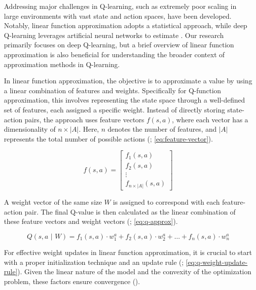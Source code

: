 \noindent Addressing major challenges in Q-learning, such as extremely poor scaling in large environments with vast state and action spaces,  have been developed. Notably, linear function approximation adopts a statistical approach, while deep Q-learning leverages artificial neural networks to estimate . Our research primarily focuses on deep Q-learning, but a brief overview of linear function approximation is also beneficial for understanding the broader context of approximation methods in Q-learning. 

\bigskip


\noindent In linear function approximation, the objective is to approximate a value by using a linear combination of features and weights. Specifically for Q-function approximation, this involves representing the state space through a well-defined set of features, each assigned a specific weight. Instead of directly storing state-action pairs, the approach uses feature vectors $f(s,a)$, where each vector has a dimensionality of $n \times |A|$. Here, $n$ denotes the number of features, and $|A|$ represents the total number of possible actions (\textcolor{deepblue}{\cite{valuemethods}; \autoref{eq:feature-vector}}).

\begin{equation}
        f(s,a) = \begin{bmatrix}
        f_1(s,a) \\
        f_2(s,a) \\
        \vdots \\
        f_{n \times |A|}(s,a)
        \end{bmatrix}
    \label{eq:feature-vector}
\end{equation}

\noindent A weight vector of the same size $W$ is assigned to correspond with each feature-action pair. The final Q-value is then calculated as the linear combination of these feature vectors and weight vectors (\textcolor{deepblue}{\cite{valuemethods}; \autoref{eq:q-approx}}).

\begin{equation}
    Q(s, a \text{ | } W) = f_1(s, a) \cdot w_1^a + f_2(s, a) \cdot w_2^a + \hdots + f_n(s, a) \cdot w_n^a
    \label{eq:q-approx}
\end{equation}

\noindent For effective weight updates in linear function approximation, it is crucial to start with a proper initialization technique and an update rule (\textcolor{deepblue}{\cite{valuemethods}; \autoref{eq:q-weight-update-rule}}). Given the linear nature of the model and the convexity of the optimization problem, these factors ensure convergence (\textcolor{deepblue}{\cite{2010Szepesvari}}).

